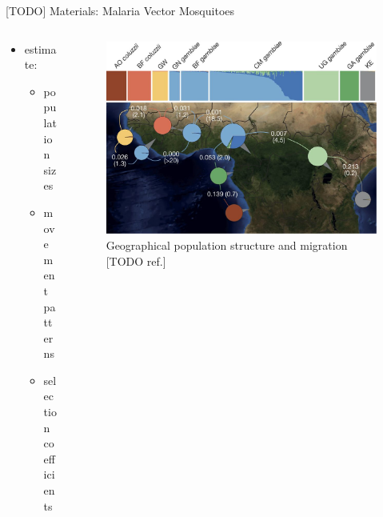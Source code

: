 \documentclass[final,hyperref={pdfpagelabels=false}]{beamer}
\begin{document}
\begin{frame}[t]
\begin{columns}[t]
\begin{column}{.465\textwidth}
\begin{block}{[TODO] Materials: Malaria Vector Mosquitoes}
\begin{columns} %
\begin{column}{.4\textwidth} %
\begin{itemize}
    \item estimate:
    \begin{itemize}
        \item population sizes
        \item movement patterns
        \item selection coefficients
    \end{itemize}
\end{itemize}
\end{column}

\begin{column}{.6\textwidth} %
\centering

\begin{figure}
\includegraphics[width=.95\linewidth]{nature-mosquitoes/fig_2}
\caption{Geographical population structure and migration [TODO ref.]}
\end{figure}


\end{column}
\end{columns}
\end{block}
\end{column}
\end{columns}
\end{frame}
\end{document}
